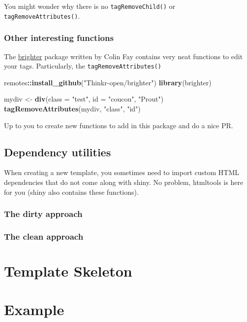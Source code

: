 \documentclass[]{book}
\newenvironment{Shaded}{\begin{snugshade}}{\end{snugshade}}
\newcommand{\DataTypeTok}[1]{\textcolor[rgb]{0.13,0.29,0.53}{#1}}
\newcommand{\KeywordTok}[1]{\textcolor[rgb]{0.13,0.29,0.53}{\textbf{#1}}}
\newcommand{\NormalTok}[1]{#1}
\newcommand{\OperatorTok}[1]{\textcolor[rgb]{0.81,0.36,0.00}{\textbf{#1}}}
\newcommand{\StringTok}[1]{\textcolor[rgb]{0.31,0.60,0.02}{#1}}
\begin{document}
You might wonder why there is no \texttt{tagRemoveChild()} or \texttt{tagRemoveAttributes()}.

\hypertarget{other-interesting-functions}{%
\subsubsection{Other interesting functions}\label{other-interesting-functions}}

The \href{https://github.com/ThinkR-open/brighter}{brighter} package written by Colin Fay contains
very neat functions to edit your tags. Particularly, the \texttt{tagRemoveAttributes()}

\begin{Shaded}
\begin{Highlighting}[]
\NormalTok{remotes}\OperatorTok{::}\KeywordTok{install_github}\NormalTok{(}\StringTok{"Thinkr-open/brighter"}\NormalTok{)}
\KeywordTok{library}\NormalTok{(brighter)}
\end{Highlighting}
\end{Shaded}

\begin{Shaded}
\begin{Highlighting}[]
\NormalTok{mydiv <-}\StringTok{ }\KeywordTok{div}\NormalTok{(}\DataTypeTok{class =} \StringTok{"test"}\NormalTok{, }\DataTypeTok{id =} \StringTok{"coucou"}\NormalTok{, }\StringTok{"Prout"}\NormalTok{)}
\KeywordTok{tagRemoveAttributes}\NormalTok{(mydiv, }\StringTok{"class"}\NormalTok{, }\StringTok{"id"}\NormalTok{)}
\end{Highlighting}
\end{Shaded}

Up to you to create new functions to add in this package and do a nice PR.

\hypertarget{dependency-utilities}{%
\subsection{Dependency utilities}\label{dependency-utilities}}

When creating a new template, you sometimes need to import custom HTML dependencies
that do not come along with shiny. No problem, htmltools is here for you (shiny also
contains these functions).

\hypertarget{the-dirty-approach}{%
\subsubsection{The dirty approach}\label{the-dirty-approach}}

\hypertarget{the-clean-approach}{%
\subsubsection{The clean approach}\label{the-clean-approach}}

\hypertarget{template-skeleton}{%
\section{Template Skeleton}\label{template-skeleton}}

\hypertarget{example}{%
\section{Example}\label{example}}


\end{document}
